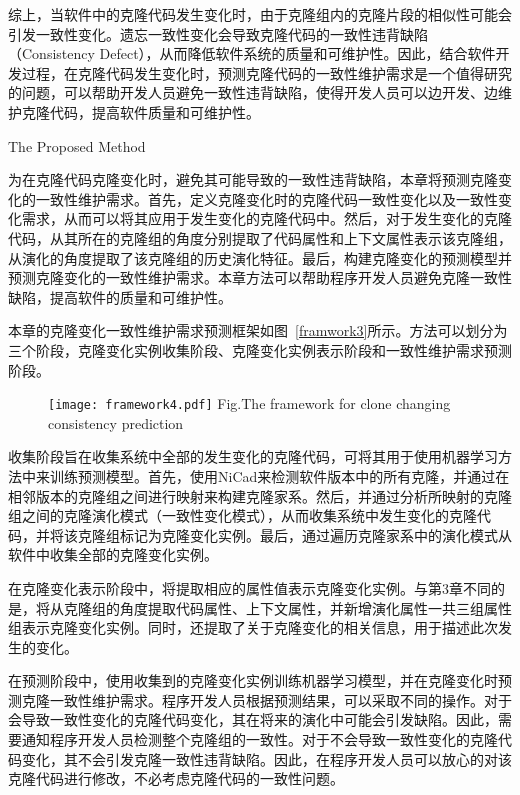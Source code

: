综上，当软件中的克隆代码发生变化时，由于克隆组内的克隆片段的相似性可能会引发一致性变化。遗忘一致性变化会导致克隆代码的一致性违背缺陷（Consistency Defect），从而降低软件系统的质量和可维护性。因此，结合软件开发过程，在克隆代码发生变化时，预测克隆代码的一致性维护需求是一个值得研究的问题，可以帮助开发人员避免一致性违背缺陷，使得开发人员可以边开发、边维护克隆代码，提高软件质量和可维护性。

{The Proposed Method}

为在克隆代码克隆变化时，避免其可能导致的一致性违背缺陷，本章将预测克隆变化的一致性维护需求。首先，定义克隆变化时的克隆代码一致性变化以及一致性变化需求，从而可以将其应用于发生变化的克隆代码中。然后，对于发生变化的克隆代码，从其所在的克隆组的角度分别提取了代码属性和上下文属性表示该克隆组，从演化的角度提取了该克隆组的历史演化特征。最后，构建克隆变化的预测模型并预测克隆变化的一致性维护需求。本章方法可以帮助程序开发人员避免克隆一致性缺陷，提高软件的质量和可维护性。

本章的克隆变化一致性维护需求预测框架如图~\ref{framwork3}所示。方法可以划分为三个阶段，克隆变化实例收集阶段、克隆变化实例表示阶段和一致性维护需求预测阶段。

\begin{figure}[htbp]
\centering
\texttt{[image: framework4.pdf]}
{Fig.$\!$}{The framework for clone changing consistency prediction}
\vspace{-1em}
\end{figure}

收集阶段旨在收集系统中全部的发生变化的克隆代码，可将其用于使用机器学习方法中来训练预测模型。首先，使用NiCad来检测软件版本中的所有克隆，并通过在相邻版本的克隆组之间进行映射来构建克隆家系。然后，并通过分析所映射的克隆组之间的克隆演化模式（一致性变化模式），从而收集系统中发生变化的克隆代码，并将该克隆组标记为克隆变化实例。最后，通过遍历克隆家系中的演化模式从软件中收集全部的克隆变化实例。

在克隆变化表示阶段中，将提取相应的属性值表示克隆变化实例。与第3章不同的是，将从克隆组的角度提取代码属性、上下文属性，并新增演化属性一共三组属性组表示克隆变化实例。同时，还提取了关于克隆变化的相关信息，用于描述此次发生的变化。

在预测阶段中，使用收集到的克隆变化实例训练机器学习模型，并在克隆变化时预测克隆一致性维护需求。程序开发人员根据预测结果，可以采取不同的操作。对于会导致一致性变化的克隆代码变化，其在将来的演化中可能会引发缺陷。因此，需要通知程序开发人员检测整个克隆组的一致性。对于不会导致一致性变化的克隆代码变化，其不会引发克隆一致性违背缺陷。因此，在程序开发人员可以放心的对该克隆代码进行修改，不必考虑克隆代码的一致性问题。

